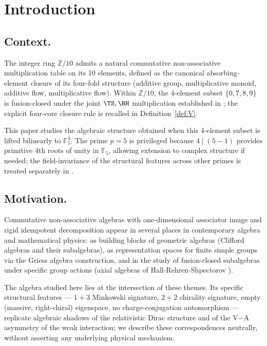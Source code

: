 \documentclass[11pt,reqno]{amsart}
\theoremstyle{plain}
\theoremstyle{definition}
\theoremstyle{remark}
\newcommand{\Z}{\mathbb{Z}}
\newcommand{\F}{\mathbb{F}}
\begin{document}
\maketitle

\tableofcontents

\section{Introduction}
\label{sec:intro}

\subsection{Context.}
The integer ring $\Z/10$ admits a natural commutative non-associative
multiplication table on its 10 elements, defined as the canonical
absorbing-element closure of its four-fold structure (additive group,
multiplicative monoid, additive flow, multiplicative flow). Within
$\Z/10$, the 4-element subset $\{0, 7, 8, 9\}$ is fusion-closed under
the joint $\TS, \BH$ multiplication established in
\cite{SandersGishFourCore}; the explicit four-core closure rule is
recalled in Definition~\ref{def:V}.

This paper studies the algebraic structure obtained when this 4-element
subset is lifted bilinearly to $\F_5^4$. The prime $p = 5$ is
privileged because $4 \mid (5-1)$ provides primitive 4th roots of unity
in $\F_5$, allowing extension to complex structure if needed; the
field-invariance of the structural features across other primes is
treated separately in \cite{SandersGishFpUniversality}.

\subsection{Motivation.}
Commutative non-associative algebras with one-dimensional associator
image and rigid idempotent decomposition appear in several places in
contemporary algebra and mathematical physics: as building blocks of
geometric algebras (Clifford algebras and their subalgebras), as
representation spaces for finite simple groups via the Griess algebra
construction, and in the study of fusion-closed subalgebras under
specific group actions (axial algebras of Hall-Rehren-Shpectorov
\cite{HallRehrenShpectorov2015}).

The algebra studied here lies at the intersection of these themes.
Its specific structural features --- $1{+}3$ Minkowski signature, $2{+}2$
chirality signature, empty (massive, right-chiral) eigenspace, no
charge-conjugation automorphism --- replicate algebraic shadows of the
relativistic Dirac structure and of the V$-$A asymmetry of the weak
interaction; we describe these correspondences neutrally, without
asserting any underlying physical mechanism.
\end{document}

